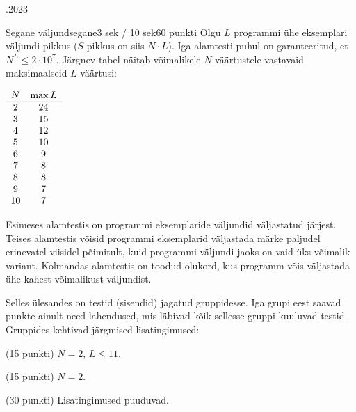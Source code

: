 \documentclass[a4paper,11pt]{article}
\begin{document}
\begin{ol}{\eio}{.2023}{\yle}{}
\begin{yl}{6}{Segane väljund}{segane}{3 sek / 10 sek}{60 punkti}
		Olgu $L$ programmi ühe eksemplari väljundi pikkus ($S$ pikkus on siis $N \cdot L$). Iga alamtesti puhul on garanteeritud, et $N^L \le 2 \cdot 10^7$. Järgnev tabel näitab võimalikele $N$ väärtustele vastavaid maksimaalseid $L$ väärtusi:
		\begin{center}
			\begin{math}
				\begin{array}{c c}
					N & \max L \\
					\hline
					2 & 24 \\
					3 & 15 \\
					4 & 12 \\
					5 & 10 \\
					6 & 9 \\
					7 & 8 \\
					8 & 8 \\
					9 & 7 \\
					10 & 7
				\end{array}
			\end{math}
		\end{center}

		\nde[0]{7cm}{5cm}

		Esimeses alamtestis on programmi eksemplaride väljundid väljastatud järjest. Teises alam\-testis võisid programmi eksemplarid väljastada märke paljudel erinevatel viisidel põimitult, kuid programmi väljundi jaoks on vaid üks võimalik variant. Kolmandas alamtestis on toodud olukord, kus programm võis väljastada ühe kahest võimalikust väljundist.

		\hnd Selles ülesandes on testid (sisendid) jagatud gruppidesse. Iga grupi eest saavad punkte ainult need lahendused, mis läbivad kõik sellesse gruppi kuuluvad testid. Gruppides kehtivad järgmised lisatingimused:
		\begin{xenum}
			\item (15 punkti) $N = 2$, $L \le 11$.
			\item (15 punkti) $N = 2$.
			\item (30 punkti) Lisatingimused puuduvad.
		\end{xenum}
	\end{yl}
\end{ol}
\end{document}
